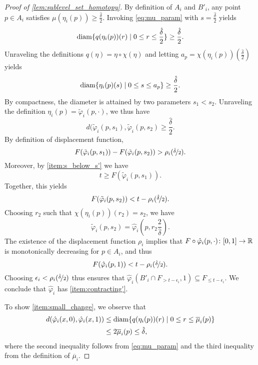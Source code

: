 \begin{proof}[Proof of \cref{lem:sublevel_set_homotopy}]
	By definition of $A_i$ and $B'_{i}$, any point $p \in A_i$ satisfies 
	$\mu(\eta_{i}(p)) \geq \frac{\hat{\delta}}{2}$.
	Invoking
	\cref{eq:mu_param} with $s = \frac{\hat{\delta}}{2}$ yields 
	\[
	\operatorname{diam}\{q(\eta_{i}(p))(r) \mid 0 \leq r \leq \frac{\hat{\delta}}{2}\} \geq \frac{\hat{\delta}}{2}.
	\]
	Unraveling the definitions $q(\eta) = \eta \circ \chi(\eta)$
	and letting $a_p = \chi(\eta_{i}(p))(\frac{\hat{\delta}}{2})$
	yields
	\[
	\operatorname{diam}\{\eta_{i}(p)(s) \mid 0 \leq s \leq a_p\} \geq \frac{\hat{\delta}}{2}.
	\]
%
%
	By compactness, the diameter is attained by two parameters $s_1<s_2$.
	Unraveling the definition $\eta_{i}(p)=\tilde{\varphi}_{i}(p,\cdot)$,
	we thus have
	\[
	d(\tilde{\varphi}_{i}(p,s_1), \tilde{\varphi}_{i}(p,s_2) \geq \frac{\hat{\delta}}{2}.\]
	By definition of displacement function, 
	\[F(\tilde{\varphi}_{i}(p,s_1)) - F(\tilde{\varphi}_{i}(p,s_2)) > \rho_{i}(\nicefrac{\hat{\delta}}{2}).\]
	Moreover, by \cref{item:s_below_s'} we have
	\[
	t \geq F(\tilde{\varphi}_{i}(p,s_1)).  
	\]
	Together, this yields
	\[F(\tilde{\varphi}_{i}(p,s_2)) < t - \rho_{i}(\nicefrac{\hat{\delta}}{2}).\]
	Choosing $r_2$ such that $\chi(\eta_{i}(p))(r_2)= s_2$,
	we have
	\[\tilde{\varphi}_{i}(p,s_2) =
	\hat{\varphi}_{i}(p,r_2\frac{2}{\hat{\delta}}).
	\]
	The existence of the displacement function $\rho_i$ implies that $F \circ \hat{\varphi}_i(p,\cdot) \colon [0,1] \to \mathbb{R}$ is monotonically decreasing for $p \in A_i$, and thus 
	\[F(\hat{\varphi}_{i}(p,1)) < t - \rho_{i}(\nicefrac{\hat{\delta}}{2}).\]
	Choosing $\epsilon_i < \rho_{i}(\nicefrac{\hat{\delta}}{2})$ thus ensures that $\hat{\varphi}_{i}(B'_{i} \cap F_{> t-\epsilon_{i}},1) \subseteq F_{\leq t-\epsilon_{i}}$.
	We conclude that $\hat{\varphi}_{i}$ has \cref{item:contracting'}.
	
	
	
	To show \cref{item:small_change}, we observe that
	\begin{align*}
	d(\hat{\varphi}_{i}(x, 0), \hat{\varphi}_{i}(x,1)) &\leq
	\diam\{q(\eta_{i}(p))(r) \mid 0 \leq r \leq \overline{\mu}_{i}(p)\} \\
	&
	\leq 2 \overline{\mu}_{i}(p)%
	\leq\hat{\delta},
	\end{align*}
	where the second inequality follows from \cref{eq:mu_param} and the third inequality from the definition of $\overline{\mu}_{i}$.
	

\end{proof}
